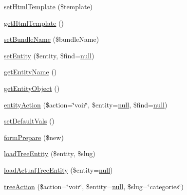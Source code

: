 \begin{DoxyCompactItemize}
\item 
\hyperlink{class_acme_group_1_1services_1_1out_puts3_1_1out_puts3_a87544fd3fbbb007bff463b22201400c4}{set\+Html\+Template} (\$template)
\item 
\hyperlink{class_acme_group_1_1services_1_1out_puts3_1_1out_puts3_a4a6b0dc06ac265f117751a9a4c3199f4}{get\+Html\+Template} ()
\item 
\hyperlink{class_acme_group_1_1services_1_1out_puts3_1_1out_puts3_abf6f0c6ca7d7a43a50ddaf1be9a38ba9}{set\+Bundle\+Name} (\$bundle\+Name)
\item 
\hyperlink{class_acme_group_1_1services_1_1out_puts3_1_1out_puts3_a80dfb93ec5f2c229797bf932a74c8435}{set\+Entity} (\$entity, \$find=\hyperlink{validate_8js_afb8e110345c45e74478894341ab6b28e}{null})
\item 
\hyperlink{class_acme_group_1_1services_1_1out_puts3_1_1out_puts3_aa6d1a83655c150883a659bb33fa1f0e1}{get\+Entity\+Name} ()
\item 
\hyperlink{class_acme_group_1_1services_1_1out_puts3_1_1out_puts3_ad97ad04f1dc00a64850bcb41d9c5b048}{get\+Entity\+Object} ()
\item 
\hyperlink{class_acme_group_1_1services_1_1out_puts3_1_1out_puts3_a2e8d5256f9a53b6bc255c9eca08a490b}{entity\+Action} (\$action=\char`\"{}voir\char`\"{}, \$entity=\hyperlink{validate_8js_afb8e110345c45e74478894341ab6b28e}{null}, \$find=\hyperlink{validate_8js_afb8e110345c45e74478894341ab6b28e}{null})
\item 
\hyperlink{class_acme_group_1_1services_1_1out_puts3_1_1out_puts3_a9eafd93c6bb4cc3dc7af2ae4d793c861}{set\+Default\+Vals} ()
\item 
\hyperlink{class_acme_group_1_1services_1_1out_puts3_1_1out_puts3_a6c5f8cedb39046b5beab158c660e8d71}{form\+Prepare} (\$new)
\item 
\hyperlink{class_acme_group_1_1services_1_1out_puts3_1_1out_puts3_a0c1eaed05c8cc629b694dd792b4b2918}{load\+Tree\+Entity} (\$entity, \$slug)
\item 
\hyperlink{class_acme_group_1_1services_1_1out_puts3_1_1out_puts3_a75b4975e638fd7b46857d4e405794c2b}{load\+Actual\+Tree\+Entity} (\$entity=\hyperlink{validate_8js_afb8e110345c45e74478894341ab6b28e}{null})
\item 
\hyperlink{class_acme_group_1_1services_1_1out_puts3_1_1out_puts3_aefd137e695322cf31b6f1ad0617245e9}{tree\+Action} (\$action=\char`\"{}voir\char`\"{}, \$entity=\hyperlink{validate_8js_afb8e110345c45e74478894341ab6b28e}{null}, \$slug=\char`\"{}categories\char`\"{})
\end{DoxyCompactItemize}
